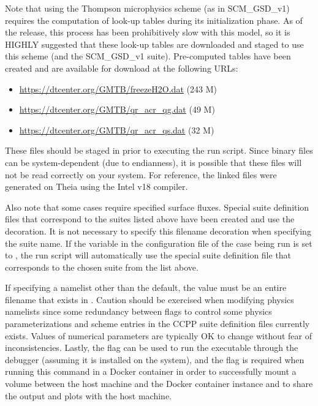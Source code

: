 Note that using the Thompson microphysics scheme (as in SCM\_GSD\_v1) requires the computation of look-up tables during its initialization phase. As of the release, this process has been prohibitively slow with this model, so it is HIGHLY suggested that these look-up tables are downloaded and staged to use this scheme (and the SCM\_GSD\_v1 suite). Pre-computed tables have been created and are available for download at the following URLs:
\begin{itemize}
\item \url{https://dtcenter.org/GMTB/freezeH2O.dat} (243 M)
\item \url{https://dtcenter.org/GMTB/qr_acr_qg.dat} (49 M)
\item \url{https://dtcenter.org/GMTB/qr_acr_qs.dat} (32 M)
\end{itemize}
These files should be staged in  prior to executing the run script. Since binary files can be system-dependent (due to endianness), it is possible that these files will not be read correctly on your system. For reference, the linked files were generated on Theia using the Intel v18 compiler.

Also note that some cases require specified surface fluxes. Special suite definition files that correspond to the suites listed above have been created and use the  decoration. It is not necessary to specify this filename decoration when specifying the suite name. If the  variable in the configuration file of the case being run is set to , the run script will automatically use the special suite definition file that corresponds to the chosen suite from the list above.

If specifying a namelist other than the default, the value must be an entire filename that exists in . Caution should be exercised when modifying physics namelists since some redundancy between flags to control some physics parameterizations and scheme entries in the CCPP suite definition files currently exists. Values of numerical parameters are typically OK to change without fear of inconsistencies. Lastly, the  flag can be used to run the executable through the  debugger (assuming it is installed on the system), and the  flag is required when running this command in a Docker container in order to successfully mount a volume between the host machine and the Docker container instance and to share the output and plots with the host machine.

